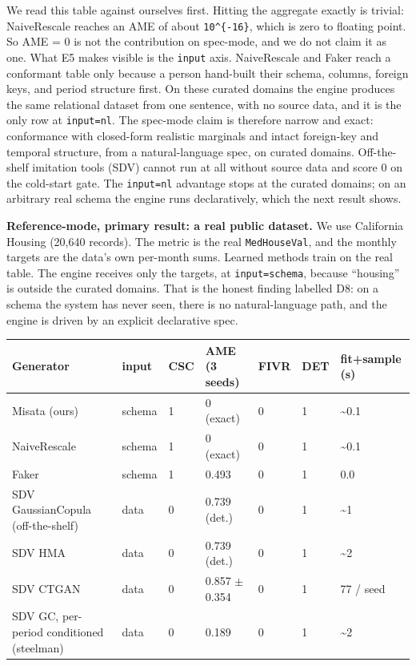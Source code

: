 We read this table against ourselves first. Hitting the aggregate
exactly is trivial: NaiveRescale reaches an AME of about
\texttt{10\^{}\{-16\}}, which is zero to floating point. So AME = 0 is
not the contribution on spec-mode, and we do not claim it as one. What
E5 makes visible is the \texttt{input} axis. NaiveRescale and Faker
reach a conformant table only because a person hand-built their schema,
columns, foreign keys, and period structure first. On these curated
domains the engine produces the same relational dataset from one
sentence, with no source data, and it is the only row at
\texttt{input=nl}. The spec-mode claim is therefore narrow and exact:
conformance with closed-form realistic marginals and intact foreign-key
and temporal structure, from a natural-language spec, on curated
domains. Off-the-shelf imitation tools (SDV) cannot run at all without
source data and score 0 on the cold-start gate. The \texttt{input=nl}
advantage stops at the curated domains; on an arbitrary real schema the
engine runs declaratively, which the next result shows.

\textbf{Reference-mode, primary result: a real public dataset.} We use
California Housing (20,640 records). The metric is the real
\texttt{MedHouseVal}, and the monthly targets are the data's own
per-month sums. Learned methods train on the real table. The engine
receives only the targets, at \texttt{input=schema}, because ``housing''
is outside the curated domains. That is the honest finding labelled D8:
on a schema the system has never seen, there is no natural-language
path, and the engine is driven by an explicit declarative spec.

\begin{longtable}[]{@{}lllllll@{}}
\toprule
Generator & input & CSC & AME (3 seeds) & FIVR & DET & fit+sample
(s)\tabularnewline
\midrule
\endhead
Misata (ours) & schema & 1 & 0 (exact) & 0 & 1 &
\textasciitilde0.1\tabularnewline
NaiveRescale & schema & 1 & 0 (exact) & 0 & 1 &
\textasciitilde0.1\tabularnewline
Faker & schema & 1 & 0.493 & 0 & 1 & 0.0\tabularnewline
SDV GaussianCopula (off-the-shelf) & data & 0 & 0.739 (det.) & 0 & 1 &
\textasciitilde1\tabularnewline
SDV HMA & data & 0 & 0.739 (det.) & 0 & 1 &
\textasciitilde2\tabularnewline
SDV CTGAN & data & 0 & 0.857 \ensuremath{\pm} 0.354 & 0 & 1 & 77 /
seed\tabularnewline
SDV GC, per-period conditioned (steelman) & data & 0 & 0.189 & 0 & 1 &
\textasciitilde2\tabularnewline
\bottomrule
\end{longtable}

